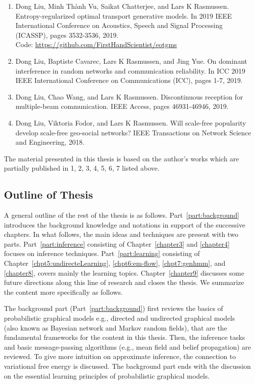 \begin{enumerate}
\item Dong Liu, Minh Th\`{a}nh Vu, Saikat Chatterjee, and Lars K Rasmussen. Entropy-regularized
  optimal transport generative models. In 2019 IEEE International Conference on Acoustics,
  Speech and Signal Processing (ICASSP), pages 3532-3536, 2019.\\
  Code: \href{https://github.com/FirstHandScientist/eotgms}{https://github.com/FirstHandScientist/eotgms}

\item Dong Liu, Baptiste Cavarec, Lars K Rasmussen, and Jing Yue. On dominant interference in random networks and communication reliability. In ICC 2019 IEEE International Conference on Communications (ICC), pages 1-7, 2019.
  
\item Dong Liu, Chao Wang, and Lars K Rasmussen. Discontinuous reception for multiple-beam communication. IEEE Access, pages 46931-46946, 2019.
  
\item Dong Liu, Viktoria Fodor, and Lars K Rasmussen. Will scale-free popularity develop scale-free geo-social networks? IEEE Transactions on Network Science and Engineering, 2018.
\end{enumerate}
The material presented in this thesis is based on the author's works which are partially published in 1, 2, 3, 4, 5, 6, 7 listed above. 
\subsection{Outline of Thesis}

A general outline of the rest of the thesis is as follows. Part~\ref{part:background} introduces the background knowledge and notations in support of the successive chapters. In what follows, the main ideas and techniques are present with two parts. Part~\ref{part:inference} consisting of Chapter~\ref{chapter3} and \ref{chapter4} focuses on inference techniques. Part~\ref{part:learning} consisting of Chapter~\ref{chpt5:undirecteLearning}, \ref{chpt6:em-flow}, \ref{chpt7:genhmm}, and \ref{chapter8}, covers mainly the learning topics. Chapter~\ref{chapter9} discusses some future directions along this line of research and closes the thesis. We summarize the content more specifically as follows.

The background part (Part~\ref{part:background}) first reviews the basics of probabilistic graphical models e.g., directed and undirected graphical models (also known as Bayesian network and Markov random fields), that are the fundamental frameworks for the content in this thesis. Then, the inference tasks and basic message-passing algorithms (e.g., mean field and belief propagation) are reviewed. To give more intuition on approximate inference, the connection to variational free energy is discussed. The background part ends with the discussion on the essential learning principles of probabilistic graphical models.

